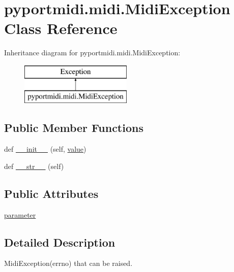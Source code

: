 \hypertarget{classpyportmidi_1_1midi_1_1_midi_exception}{}\section{pyportmidi.\+midi.\+Midi\+Exception Class Reference}
\label{classpyportmidi_1_1midi_1_1_midi_exception}
Inheritance diagram for pyportmidi.\+midi.\+Midi\+Exception\+:\begin{figure}[H]
\begin{center}
\leavevmode
\includegraphics[height=2.000000cm]{classpyportmidi_1_1midi_1_1_midi_exception}
\end{center}
\end{figure}
\subsection*{Public Member Functions}
\begin{DoxyCompactItemize}
\item 
def \hyperlink{classpyportmidi_1_1midi_1_1_midi_exception_ae960d2b683219c38240d25603a5762bb}{\+\_\+\+\_\+init\+\_\+\+\_\+} (self, \hyperlink{lib_2expat_8h_a4a30a13b813682e68c5b689b45c65971}{value})
\item 
def \hyperlink{classpyportmidi_1_1midi_1_1_midi_exception_a4e07b970a4cd4ea303d2c55406ab531f}{\+\_\+\+\_\+str\+\_\+\+\_\+} (self)
\end{DoxyCompactItemize}
\subsection*{Public Attributes}
\begin{DoxyCompactItemize}
\item 
\hyperlink{classpyportmidi_1_1midi_1_1_midi_exception_abe32a7a0db3a0b7cd745c685bbbe7a30}{parameter}
\end{DoxyCompactItemize}


\subsection{Detailed Description}
\begin{DoxyVerb}MidiException(errno) that can be raised.
\end{DoxyVerb}
 

